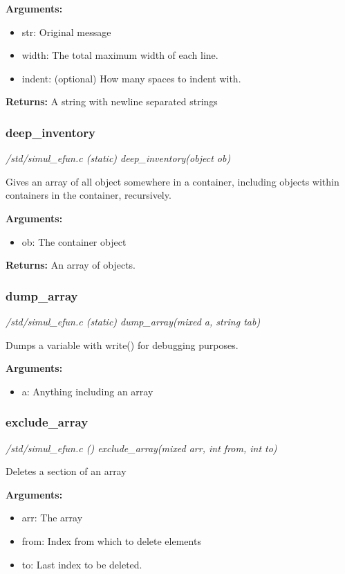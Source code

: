 {\bf Arguments:}
\begin{itemize}
\item      str: Original message
\item width: The total maximum width of each line.
\item indent: (optional) How many spaces to indent with.
\end{itemize}

{\bf Returns:}        A string with newline separated strings


\subsubsection{deep\_inventory}

{\em /std/simul\_efun.c (static) deep\_inventory(object ob)}

Gives an array of all object somewhere in a container,
including objects within containers in the container,
recursively.

{\bf Arguments:}
\begin{itemize}
\item      ob: The container object
\end{itemize}

{\bf Returns:}        An array of objects.


\subsubsection{dump\_array}

{\em /std/simul\_efun.c (static) dump\_array(mixed a, string tab)}

Dumps a variable with write() for debugging purposes.

{\bf Arguments:}
\begin{itemize}
\item      a: Anything including an array
\end{itemize}


\subsubsection{exclude\_array}

{\em /std/simul\_efun.c () exclude\_array(mixed arr, int from, int to)}

Deletes a section of an array

{\bf Arguments:}
\begin{itemize}
\item      arr: The array
\item from: Index from which to delete elements
\item to: Last index to be deleted.
\end{itemize}

